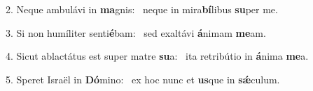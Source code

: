 2. Neque ambulávi in \textbf{ma}gnis: \ast\  neque in mira\textbf{bí}libus \textbf{su}per me.\

3. Si non humíliter senti\textbf{é}bam: \ast\  sed exaltávi \textbf{á}nimam \textbf{me}am.\

4. Sicut ablactátus est super matre \textbf{su}a: \ast\  ita retribútio in \textbf{á}nima \textbf{me}a.\

5. Speret Israël in \textbf{Dó}mino: \ast\  ex hoc nunc et \textbf{us}que in \textbf{sǽ}culum.\

